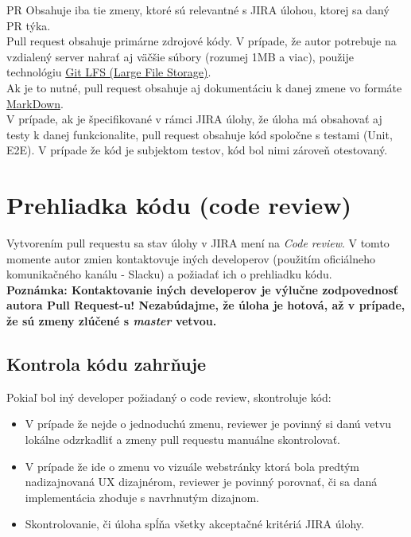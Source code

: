 \documentclass{article}
\begin{document}
    PR Obsahuje iba tie zmeny, ktoré sú relevantné s JIRA úlohou, ktorej sa daný PR týka.\\

    \noindent Pull request obsahuje primárne zdrojové kódy. V prípade, že autor potrebuje na vzdialený server nahrať aj väčšie
    súbory (rozumej 1MB a viac), použije technológiu \href{https://git-lfs.github.com/}{Git LFS (Large File Storage)}.\\

    \noindent Ak je to nutné, pull request obsahuje aj dokumentáciu k danej zmene vo formáte \href{https://www.markdownguide.org/}{MarkDown}.\\

    \noindent V prípade, ak je špecifikované v rámci JIRA úlohy, že úloha má obsahovať aj testy k danej funkcionalite,
    pull request obsahuje kód spoločne s testami (Unit, E2E). V prípade že kód je subjektom testov, kód bol nimi zároveň otestovaný.


    \section*{Prehliadka kódu (code review)}

    Vytvorením pull requestu sa stav úlohy v JIRA mení na \emph{Code review}.
    V tomto momente autor zmien kontaktovuje iných developerov (použitím oficiálneho
    komunikačného kanálu - Slacku) a požiadať ich o prehliadku kódu.\\

    \noindent \textbf{Poznámka: Kontaktovanie iných developerov je výlučne zodpovednosť autora Pull Request-u!
    Nezabúdajme, že úloha je hotová, až v prípade, že sú zmeny zlúčené s \emph{master} vetvou.} \\

    \subsection*{Kontrola kódu zahrňuje}

    \noindent Pokiaľ bol iný developer požiadaný o code review, skontroluje kód:

    \begin{itemize}
        \item V prípade že nejde o jednoduchú zmenu, reviewer je povinný si danú vetvu lokálne odzrkadliť a zmeny pull
        requestu manuálne skontrolovať.
        \item V prípade že ide o zmenu vo vizuále webstránky ktorá bola predtým nadizajnovaná UX dizajnérom, reviewer je povinný
        porovnať, či sa daná implementácia zhoduje s navrhnutým dizajnom.
        \item Skontrolovanie, či úloha spĺňa všetky akceptačné kritériá JIRA úlohy.
    \end{itemize}
\end{document}
